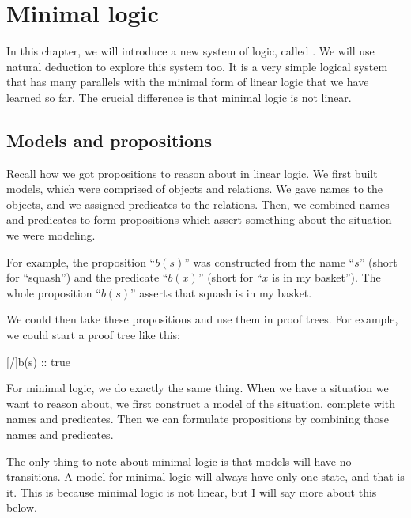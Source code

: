 \documentclass[../../../main.tex]{subfiles}
\begin{document}
\chapter{Minimal logic}

In this chapter, we will introduce a new system of logic, called . We will use natural deduction to explore this system too. It is a very simple logical system that has many parallels with the minimal form of linear logic that we have learned so far. The crucial difference is that minimal logic is not linear.


\section{Models and propositions}

Recall how we got propositions to reason about in linear logic. We first built models, which were comprised of objects and relations. We gave names to the objects, and we assigned predicates to the relations. Then, we combined names and predicates to form propositions which assert something about the situation we were modeling. 

For example, the proposition ``$b(s)$'' was constructed from the name ``$s$'' (short for ``squash'') and the predicate ``$b(x)$'' (short for ``$x$ is in my basket''). The whole proposition ``$b(s)$'' asserts that squash is in my basket.

We could then take these propositions and use them in proof trees. For example, we could start a proof tree like this:

\begin{prooftree*}
  \hypo{}
  [\startrule/]{b(s) :: true}
\end{prooftree*}

\noindent
For minimal logic, we do exactly the same thing. When we have a situation we want to reason about, we first construct a model of the situation, complete with names and predicates. Then we can formulate propositions by combining those names and predicates. 

The only thing to note about minimal logic is that models will have no transitions. A model for minimal logic will always have only one state, and that is it. This is because minimal logic is not linear, but I will say more about this below.
\end{document}
